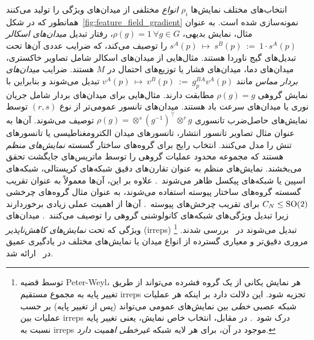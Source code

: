 				
				انتخاب‌های مختلف نمایش‌ها $\rho_i$ \emph{انواع} مختلفی از میدان‌های ویژگی را تولید می‌کنند همانطور که در شکل~\ref{fig:feature_field_gradient} نمونه‌سازی شده است.
				به عنوان مثال، نمایش بدیهی، $\rho(g)=1\ \forall g\in G$، رفتار تبدیل \emph{میدان‌های اسکالر} $s^A(p)\ \mapsto\ s^B(p)\ :=\ 1\cdot s^A(p)$ را توصیف می‌کند، که ضرایب عددی آن‌ها تحت تبدیل‌های گیج ناوردا هستند.
				مثال‌هایی از میدان‌های اسکالر شامل تصاویر خاکستری، میدان‌های دما، میدان‌های فشار یا توزیع‌های احتمال در $M$ هستند.
				ضرایب \emph{میدان‌های بردار مماس} مانند $v^A(p)\ \mapsto\ v^B(p)\ :=\ g_p^{BA}v^A(p)$ تبدیل می‌شوند و بنابراین با نمایش گروهی $\rho(g)=g$ مطابقت دارند.
				مثال‌هایی برای میدان‌های بردار شامل جریان نوری یا میدان‌های سرعت باد هستند.
				میدان‌های تانسور عمومی‌تر از نوع $(r,s)$ توسط نمایش‌های حاصل‌ضرب تانسوری $\rho(g) = \otimes^s\left(g^{-1}\right)^{\!\top} \otimes^r g$ توصیف می‌شوند.
				آن‌ها به عنوان مثال تصاویر تانسور انتشار، تانسورهای میدان الکترومغناطیسی یا تانسورهای تنش را مدل می‌کنند.
				انتخاب رایج برای گروه‌های ساختار گسسته \emph{نمایش‌های منظم} هستند که مجموعه محدود عملیات گروهی را توسط ماتریس‌های جایگشت تحقق می‌بخشند.
				نمایش‌های منظم به عنوان تقارن‌های دقیق شبکه‌های کریستالی، شبکه‌های اسپین یا شبکه‌های پیکسل ظاهر می‌شوند~\cite{Cohen2016-GCNN,Hoogeboom2018-HEX,winkels3DGCNNsPulmonary2018,Worrall2018-CUBENET,gaugeIco2019}.
				علاوه بر این، آن‌ها معمولاً به عنوان تقریب گسسته گروه‌های ساختار پیوسته استفاده می‌شوند، به عنوان مثال گروه‌های چرخشی $C_N\leq\operatorname{SO}(2)$ برای تقریب چرخش‌های پیوسته~\cite{Weiler2018SFCNN,bekkers2018roto,Weiler2019_E2CNN,bekkers2020bspline,Marcos2017-VFN}.
				آن‌ها از اهمیت عملی زیادی برخوردارند زیرا تبدیل ویژگی‌های شبکه‌های کانولوشنی گروهی را توصیف می‌کنند~\cite{Cohen2016-GCNN}.
				میدان‌های ویژگی که تحت \emph{نمایش‌های کاهش‌ناپذیر} (irreps) تبدیل می‌شوند در~\cite{Worrall2017-HNET,3d_steerableCNNs,Thomas2018-TFN,Kondor2018-NBN,anderson2019cormorant,Weiler2019_E2CNN,jiang2019spherical} بررسی شدند.%
				\footnote{
					\label{footnote:feature_field_irrep_decomposition}
					توسط قضیه Peter-Weyl، هر نمایش یکانی از یک گروه فشرده می‌تواند از طریق تغییر پایه به مجموع مستقیم irreps تجزیه شود.
					این دلالت دارد بر اینکه هر عملیات شبکه عصبی \emph{خطی} بین نمایش‌های عمومی می‌تواند (پس از تغییر پایه) بر حسب عملیات بین irreps درک شود~\cite{Weiler2019_E2CNN,lang2020WignerEckart}.
					در مقابل، انتخاب خاص نمایش، یعنی تغییر پایه نسبت به irreps موجود در آن، برای هر لایه شبکه \emph{غیرخطی} \emph{اهمیت دارد}.
				}
				مروری دقیق‌تر و معیاری گسترده از انواع میدان یا نمایش‌های مختلف در یادگیری عمیق در~\cite{Weiler2019_E2CNN} ارائه شد.
				
